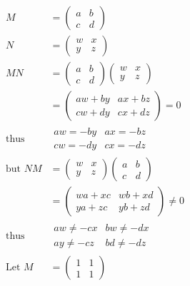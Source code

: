 \documentclass[11pt]{amsart}
\theoremstyle{definition}  %
\begin{document}
\begin{align*}
	M &= \left ( \begin{array}{cc}
		a & b\\
		c & d
\end{array}	 \right ) \\
	N &= \left ( \begin{array}{cc}
		w & x\\
		y & z
\end{array}	 \right ) \\
	MN &= \left ( \begin{array}{cc}
		a & b\\
		c & d
\end{array}	 \right )\left ( \begin{array}{cc}
		w & x\\
		y & z
\end{array}	 \right ) \\
	&= \left ( \begin{array}{cc}
		aw+by & ax+bz \\
		cw+dy & cx+dz
\end{array}	 \right ) =0 \\
	\text{thus } &\begin{array}{c|c}
		aw= -by & ax=-bz \\
		cw= -dy & cx = -dz
	\end{array}  \\
	\text{but } NM &= \left ( \begin{array}{cc}
		w & x\\
		y & z
\end{array}	 \right )\left ( \begin{array}{cc}
		a & b\\
		c & d
\end{array}	 \right ) \\
	&= \left (\begin{array}{cc}
		wa+xc & wb+xd \\
		ya+zc & yb+zd
\end{array}	 \right ) \ne 0\\
	\text{thus } &\begin{array}{c|c}
		aw \ne -cx & bw \ne -dx \\
		ay \ne -cz  & bd \ne -dz
	\end{array}  \\
	\text{Let } 	M &= \left ( \begin{array}{cc}
		1 & 1\\
		1 & 1
\end{array}	 \right ) 

\end{align*}
\end{document}
